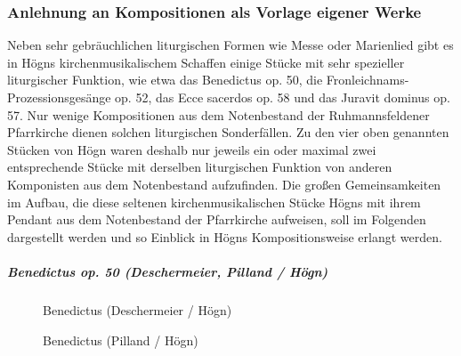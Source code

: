 \subsubsection{Anlehnung an Kompositionen als Vorlage eigener Werke}

Neben sehr gebräuchlichen liturgischen Formen wie Messe oder Marienlied
gibt es in Högns kirchenmusikalischem Schaffen einige Stücke mit sehr
spezieller liturgischer Funktion, wie etwa das Benedictus op. 50, die
Fronleichnams-Prozessionsgesänge op. 52, das Ecce sacerdos op. 58 und
das Juravit dominus op. 57. Nur wenige Kompositionen aus dem
Notenbestand der Ruhmannsfeldener Pfarrkirche dienen solchen
liturgischen Sonderfällen. Zu den vier oben genannten Stücken von Högn
waren deshalb nur jeweils ein oder maximal zwei entsprechende Stücke mit
derselben liturgischen Funktion von anderen Komponisten aus dem
Notenbestand aufzufinden. Die großen Gemeinsamkeiten im Aufbau, die
diese seltenen kirchenmusikalischen Stücke Högns mit ihrem Pendant aus
dem Notenbestand der Pfarrkirche aufweisen, soll im Folgenden
dargestellt werden und so Einblick in Högns Kompositionsweise erlangt
werden.

\subparagraph{Benedictus op. 50 (Deschermeier, Pilland / Högn)}

\begin{figure}
\caption{Benedictus (Deschermeier / Högn)}
\end{figure}

\begin{figure}
\caption{Benedictus (Pilland / Högn)}
\end{figure}

